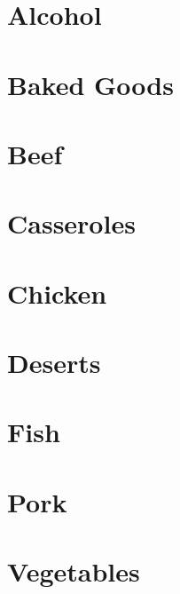 
\chapter{Alcohol}



\chapter{Baked Goods}







\chapter{Beef}

\chapter{Casseroles}

\chapter{Chicken}



\chapter{Deserts}


\chapter{Fish}

\chapter{Pork}


\chapter{Vegetables}



